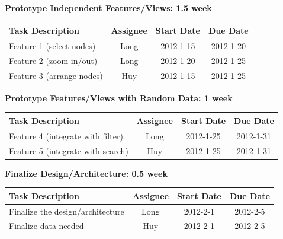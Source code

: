 \documentclass[12pt, letterpaper]{article}
\begin{document}
\begin{center}
		{\bf Prototype Independent Features/Views: 1.5 week}
    \begin{tabular}{| p{8.3cm} || c | c | c | }
      \hline
      Task Description & Assignee & Start Date & Due Date \\
      \hline
	    Feature 1 (select nodes) & Long & 2012-1-15 & 2012-1-20 \\
	    Feature 2 (zoom in/out)  & Long & 2012-1-20 & 2012-1-25 \\
	    Feature 3 (arrange nodes)  & Huy & 2012-1-15 & 2012-1-25 \\
      \hline
    \end{tabular}
  \end{center}

\begin{center}
		{\bf Prototype Features/Views with Random Data: 1 week}
    \begin{tabular}{| p{8.3cm} || c | c | c | }
      \hline
      Task Description & Assignee & Start Date & Due Date \\
      \hline
	    Feature 4 (integrate with filter)  & Long & 2012-1-25 & 2012-1-31 \\
            Feature 5 (integrate with search) & Huy & 2012-1-25 & 2012-1-31 \\
      \hline
    \end{tabular}
  \end{center}

  \begin{center}
		{\bf Finalize Design/Architecture: 0.5 week}
    \begin{tabular}{|p{8.3cm} || c | c | c | }
      \hline
      Task Description & Assignee & Start Date & Due Date \\
      \hline
	    Finalize the design/architecture & Long & 2012-2-1 & 2012-2-5 \\
	    Finalize data needed  & Huy & 2012-2-1 & 2012-2-5 \\
      \hline
    \end{tabular}
  \end{center}
\end{document}
